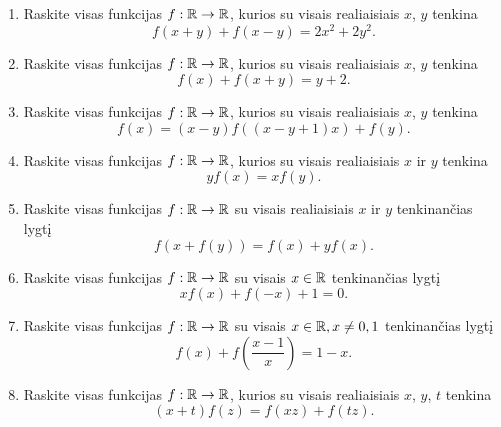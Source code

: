 \begin{enumerate}
  \item Raskite visas funkcijas $f:\mathbb R\to\mathbb R$, kurios su
    visais realiaisiais $x$, $y$ tenkina $$f(x+y)+f(x-y)=2x^2+2y^2.$$
  \item Raskite visas funkcijas $f:\mathbb R\to\mathbb R$, kurios su visais realiaisiais
    $x$, $y$ tenkina $$f(x)+f(x+y)=y+2.$$
  \item Raskite visas funkcijas $f:\mathbb R\to\mathbb R$, kurios su visais realiaisiais
    $x$, $y$ tenkina $$f(x)=(x-y)f((x-y+1)x) + f(y).$$
  \item Raskite visas funkcijas $f:\mathbb R\to\mathbb R$, kurios su visais realiaisiais
    $x$ ir $y$ tenkina $$yf(x) = xf(y).$$
  \item Raskite visas funkcijas $f:\mathbb R\to\mathbb R$ su visais realiaisiais
    $x$ ir $y$ tenkinančias lygtį $$f(x +f(y)) = f(x) + yf(x).$$
  \item Raskite visas funkcijas $f:\mathbb R\to\mathbb R$ su visais $x\in \mathbb R$ tenkinančias
    lygtį $$xf(x) + f(-x) + 1 = 0.$$
  \item Raskite visas funkcijas $f:\mathbb R\to\mathbb R$ su visais $x\in\mathbb R, x\neq 0,1$
    tenkinančias lygtį $$f(x) + f(\frac{x-1}{x})= 1-x.$$
  \item Raskite visas funkcijas $f:\mathbb R\to\mathbb R$, kurios su visais realiaisiais
    $x$, $y$, $t$ tenkina $$(x+t)f(z) = f(xz) + f(tz).$$

\end{enumerate}

